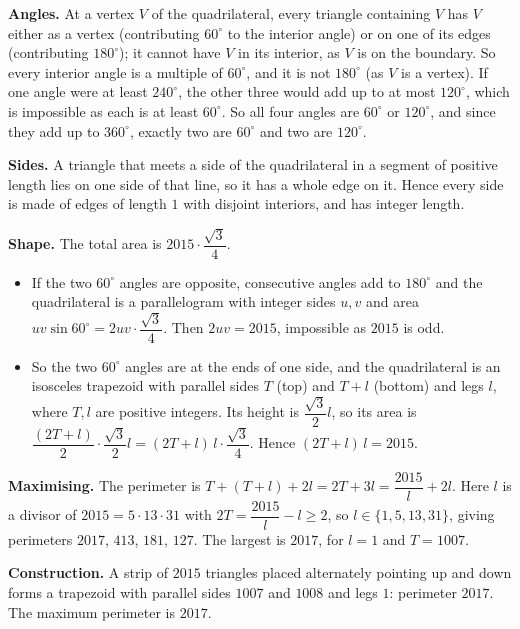 \textbf{Angles.} At a vertex $V$ of the quadrilateral, every triangle containing $V$ has $V$ either as a vertex (contributing $60^\circ$ to the interior angle) or on one of its edges (contributing $180^\circ$); it cannot have $V$ in its interior, as $V$ is on the boundary. So every interior angle is a multiple of $60^\circ$, and it is not $180^\circ$ (as $V$ is a vertex). If one angle were at least $240^\circ$, the other three would add up to at most $120^\circ$, which is impossible as each is at least $60^\circ$. So all four angles are $60^\circ$ or $120^\circ$, and since they add up to $360^\circ$, exactly two are $60^\circ$ and two are $120^\circ$.

\textbf{Sides.} A triangle that meets a side of the quadrilateral in a segment of positive length lies on one side of that line, so it has a whole edge on it. Hence every side is made of edges of length $1$ with disjoint interiors, and has integer length.

\textbf{Shape.} The total area is $2015\cdot\dfrac{\sqrt3}{4}$.
\begin{itemize}
\item If the two $60^\circ$ angles are opposite, consecutive angles add to $180^\circ$ and the quadrilateral is a parallelogram with integer sides $u,v$ and area $uv\sin60^\circ=2uv\cdot\dfrac{\sqrt3}4$. Then $2uv=2015$, impossible as $2015$ is odd.
\item So the two $60^\circ$ angles are at the ends of one side, and the quadrilateral is an isosceles trapezoid with parallel sides $T$ (top) and $T+l$ (bottom) and legs $l$, where $T,l$ are positive integers. Its height is $\dfrac{\sqrt3}2l$, so its area is $\dfrac{(2T+l)}{2}\cdot\dfrac{\sqrt3}{2}l=(2T+l)\,l\cdot\dfrac{\sqrt3}{4}$. Hence $(2T+l)\,l=2015$.
\end{itemize}
\textbf{Maximising.} The perimeter is $T+(T+l)+2l=2T+3l=\dfrac{2015}{l}+2l$. Here $l$ is a divisor of $2015=5\cdot13\cdot31$ with $2T=\dfrac{2015}l-l\ge2$, so $l\in\{1,5,13,31\}$, giving perimeters $2017$, $413$, $181$, $127$. The largest is $2017$, for $l=1$ and $T=1007$.

\textbf{Construction.} A strip of $2015$ triangles placed alternately pointing up and down forms a trapezoid with parallel sides $1007$ and $1008$ and legs $1$: perimeter $2017$. The maximum perimeter is $\boxed{2017}$.

